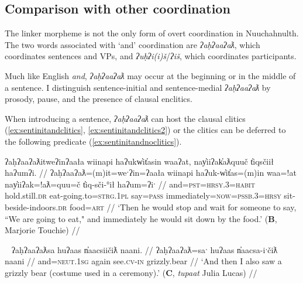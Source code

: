 \subsection{Comparison with other coordination} \label{ch:link:others}

The linker morpheme is not the only form of overt coordination in Nuuchahnulth. The two words associated with `and' coordination are \textit{ʔaḥʔaaʔaƛ}, which coordinates sentences and VPs, and \textit{ʔuḥʔi(i)š}/\textit{ʔiš}, which coordinates participants.  %

Much like English \textit{and}, \textit{ʔaḥʔaaʔaƛ} may occur at the beginning or in the middle of a sentence. I distinguish sentence-initial and sentence-medial \textit{ʔaḥʔaaʔaƛ} by prosody, pause, and the presence of clausal enclitics.

When introducing a sentence, \textit{ʔaḥʔaaʔaƛ} can host the clausal clitics (\ref{ex:sentinitandclitics}, \ref{ex:sentinitandclitics2}) or the clitics can be deferred to the following predicate (\ref{ex:sentinitandnoclitics}).

\begin{comment}
Context for (): Describing a picture-story.

ʔaanamtqač̓a ʔuusuqtack̓in.
And then he got hurt a little bit.

ʔaḥʔaaʔaƛƛa ƛakišiʔeƛƛa.
And then he stands back up.
BM
\end{comment}

\ex \label{ex:sentinitandclitics}
\begingl
\glpreamble ʔaḥʔaaʔaƛitweʔinʔaała wiinapi haʔukw̓it̓asin waaʔat, nay̓iiʔak̓aƛquuč t̓iqsčiił haʔumʔi. //
\gla ʔaḥʔaaʔaƛ=(m)it=weˑʔin=ʔaała wiinapi haʔuk-w̓it̓as=(m)in waa=!at nay̓iiʔak=!aƛ=quu=č t̓iq-sči-°ił haʔum=ʔiˑ //
\glb and=\textsc{pst}=\textsc{hrsy.3}=\textsc{habit} hold.still.\textsc{dr} eat-going.to=\textsc{strg.1pl} say=\textsc{pass} immediately=\textsc{now}=\textsc{pssb.3}=\textsc{hrsy} sit-beside-indoors.\textsc{dr} food=\textsc{art} //
\glft `Then he would stop and wait for someone to say, ``We are going to eat," and immediately he would sit down by the food.' (\textbf{B}, Marjorie Touchie) //
\endgl
\xe


\ex~ \label{ex:sentinitandclitics2}
\begingl
\glpreamble ʔaḥʔaaʔaƛsa huʔaas n̓aacsiičiƛ naani. //
\gla ʔaḥʔaaʔaƛ=saˑ huʔaas n̓aacsa-iˑčiƛ naani //
\glb and=\textsc{neut.1sg} again see.\textsc{cv}-\textsc{in} grizzly.bear  //
\glft `And then I also saw a grizzly bear (costume used in a ceremony).' (\textbf{C}, \textit{tupaat} Julia Lucas) //
\endgl
\xe


